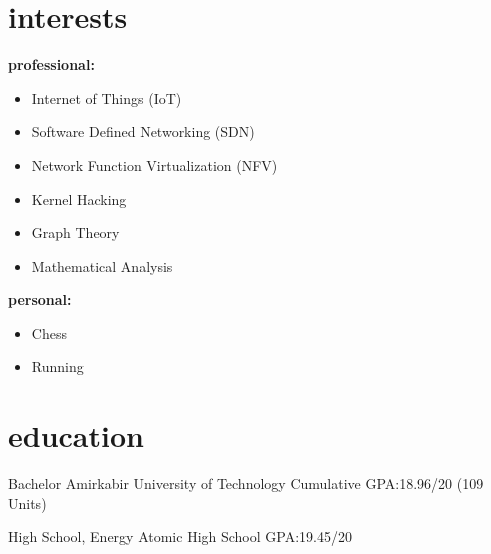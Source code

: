 \documentclass[]{friggeri-cv} %
\begin{document}

\section{interests}
\textbf{professional:}
\begin{itemize}
	\item Internet of Things (IoT)
	\item Software Defined Networking (SDN)
	\item Network Function Virtualization (NFV)
	\item Kernel Hacking
	\item Graph Theory
	\item Mathematical Analysis
\end{itemize}
\textbf{personal:}
\begin{itemize}	
	\item Chess
	\item Running
\end{itemize}



\section{education}

\begin{entrylist}


	{Bachelor }
	{Amirkabir University of Technology}
	{Cumulative GPA:\@ 18.96/20 (109 Units)}


	{High School, }
	{Energy Atomic High School}
	{GPA:\@ 19.45/20}



\end{entrylist}
\pagebreak

\end{document}
